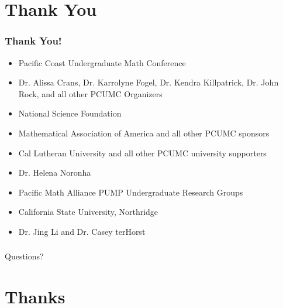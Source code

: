 \documentclass[10pt]{beamer}
\begin{document}
\section{Thank You}
\begin{frame}
	\frametitle{Thank You!}
	\begin{itemize}
		\item Pacific Coast Undergraduate Math Conference
		\item Dr. Alissa Crans, Dr. Karrolyne Fogel, Dr. Kendra Killpatrick, Dr. John Rock, and all other PCUMC Organizers
		\item National Science Foundation
		\item Mathematical Association of America and all other PCUMC sponsors
		\item Cal Lutheran University and all other PCUMC university supporters
		\item Dr. Helena Noronha
		\item Pacific Math Alliance PUMP Undergraduate Research Groups
		\item California State University, Northridge
		\item Dr. Jing Li and Dr. Casey terHorst
	\end{itemize}
\end{frame}
\begin{frame}
	\frametitle{}
	\begin{center}
		{\Huge Questions?}
	\end{center}
\end{frame}

\section{Thanks}
\end{document}
